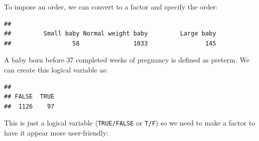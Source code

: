 \documentclass[
]{book}
\newenvironment{Shaded}{\begin{snugshade}}{\end{snugshade}}
\newcommand{\AttributeTok}[1]{\textcolor[rgb]{0.77,0.63,0.00}{#1}}
\newcommand{\ConstantTok}[1]{\textcolor[rgb]{0.00,0.00,0.00}{#1}}
\newcommand{\DecValTok}[1]{\textcolor[rgb]{0.00,0.00,0.81}{#1}}
\newcommand{\FunctionTok}[1]{\textcolor[rgb]{0.00,0.00,0.00}{#1}}
\newcommand{\NormalTok}[1]{#1}
\newcommand{\OtherTok}[1]{\textcolor[rgb]{0.56,0.35,0.01}{#1}}
\newcommand{\SpecialCharTok}[1]{\textcolor[rgb]{0.00,0.00,0.00}{#1}}
\newcommand{\StringTok}[1]{\textcolor[rgb]{0.31,0.60,0.02}{#1}}
\begin{document}
To impose an order, we can convert to a factor and specify the order:

\begin{Shaded}
\end{Shaded}

\begin{verbatim}
## 
##         Small baby Normal weight baby         Large baby 
##                 58               1033                145
\end{verbatim}

A baby born before 37 completed weeks of pregnancy is defined as preterm. We can create this logical variable as:

\begin{Shaded}
\end{Shaded}

\begin{verbatim}
## 
## FALSE  TRUE 
##  1126    97
\end{verbatim}

This is just a logical variable (\texttt{TRUE/FALSE} or \texttt{T/F}) so we need to make a factor to have it appear more user-friendly:

\begin{Shaded}
\end{Shaded}
\end{document}
